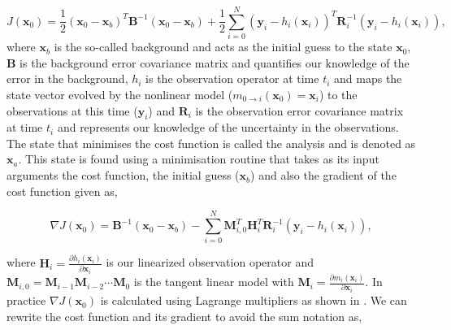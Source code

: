 \documentclass[11pt]{article}
\begin{document}
\begin{equation}
J(\textbf{x}_0) = \frac{1}{2}(\textbf{x}_0-\textbf{x}_b)^{T}\textbf{B}^{-1}(\textbf{x}_0-\textbf{x}_b)+\frac{1}{2}\sum_{i=0}^{N}(\textbf{y}_i-h_i(\textbf{x}_i))^{T}\textbf{R}_{i}^{-1}(\textbf{y}_i-h_i(\textbf{x}_i)),
\end{equation}
where $\textbf{x}_b$ is the so-called background and acts as the initial guess to the state $\textbf{x}_0$, $\textbf{B}$ is the background error covariance matrix and quantifies our knowledge of the error in the background, $h_i$ is the observation operator at time $t_i$ and maps the state vector evolved by the nonlinear model ($m_{0\rightarrow i}(\mathbf{x}_{0})=\textbf{x}_i$) to the observations at this time ($\textbf{y}_i$) and $\textbf{R}_i$ is the observation error covariance matrix at time $t_i$ and represents our knowledge of the uncertainty in the observations. The state that minimises the cost function is called the analysis and is denoted as $\textbf{x}_a$. This state is found using a minimisation routine that takes as its input arguments the cost function, the initial guess ($\textbf{x}_b$) and also the gradient of the cost function given as,

\begin{equation}
\nabla J(\textbf{x}_0) = \textbf{B}^{-1}(\textbf{x}_0-\textbf{x}_b)-\sum_{i=0}^{N}\textbf{M}_{i,0}^{T}\textbf{H}_i^{T}\textbf{R}_{i}^{-1}(\textbf{y}_i-h_i(\textbf{x}_i)),
\end{equation}

where $\textbf{H}_i = \frac{\partial h_i(\textbf{x}_i)}{\partial\textbf{x}_i}$ is our linearized observation operator and $\mathbf{M}_{i,0}=\mathbf{M}_{i-1}\mathbf{M}_{i-2}\cdots\mathbf{M}_0$ is the tangent linear model with $\mathbf{M}_i=\frac{\partial m_{i}(\textbf{x}_{i})}{\partial \textbf{x}_{i}}$. In practice $\nabla J(\textbf{x}_0)$ is calculated using Lagrange multipliers as shown in \citet{lawless2013}. We can rewrite the cost function and its gradient to avoid the sum notation as,
\end{document}
